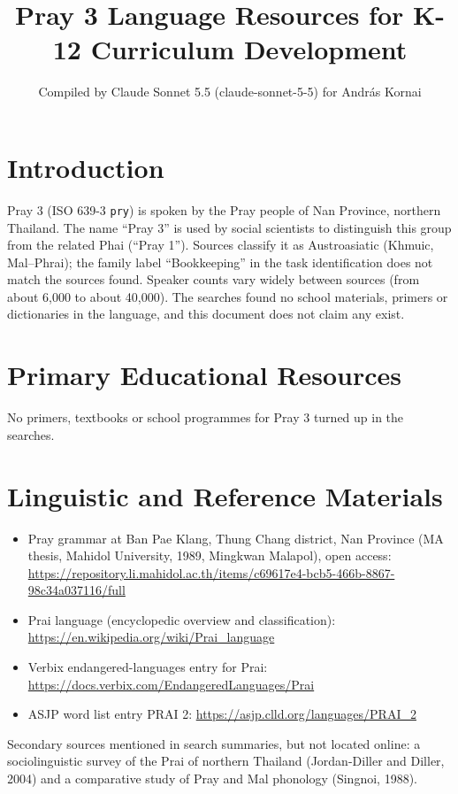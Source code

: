 \documentclass[12pt]{article}
\title{Pray 3 Language Resources for K-12 Curriculum Development}
\author{Compiled by Claude Sonnet 5.5 (claude-sonnet-5-5) for Andr\'as Kornai}
\date{}
\begin{document}
\maketitle

\section{Introduction}
Pray 3 (ISO 639-3 \texttt{pry}) is spoken by the Pray people of Nan Province, northern Thailand. The name ``Pray 3'' is used by social scientists to distinguish this group from the related Phai (``Pray 1''). Sources classify it as Austroasiatic (Khmuic, Mal--Phrai); the family label ``Bookkeeping'' in the task identification does not match the sources found. Speaker counts vary widely between sources (from about 6,000 to about 40,000). The searches found no school materials, primers or dictionaries in the language, and this document does not claim any exist.

\section{Primary Educational Resources}
No primers, textbooks or school programmes for Pray 3 turned up in the searches.

\section{Linguistic and Reference Materials}
\begin{itemize}
\item Pray grammar at Ban Pae Klang, Thung Chang district, Nan Province (MA thesis, Mahidol University, 1989, Mingkwan Malapol), open access: \url{https://repository.li.mahidol.ac.th/items/c69617e4-bcb5-466b-8867-98c34a037116/full}
\item Prai language (encyclopedic overview and classification): \url{https://en.wikipedia.org/wiki/Prai_language}
\item Verbix endangered-languages entry for Prai: \url{https://docs.verbix.com/EndangeredLanguages/Prai}
\item ASJP word list entry PRAI 2: \url{https://asjp.clld.org/languages/PRAI_2}
\end{itemize}
Secondary sources mentioned in search summaries, but not located online: a sociolinguistic survey of the Prai of northern Thailand (Jordan-Diller and Diller, 2004) and a comparative study of Pray and Mal phonology (Singnoi, 1988).
\end{document}
